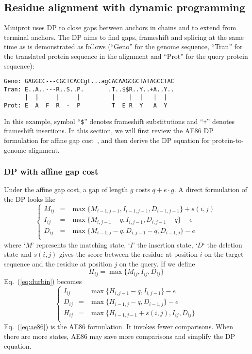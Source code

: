 \documentclass{bioinfo}
\begin{document}
\begin{methods}
\subsection{Residue alignment with dynamic programming}

Miniprot uses DP to close gaps between anchors in chains and to extend from
terminal anchors. The DP aims to find gaps, frameshift and splicing at the
same time as is demonstrated as follows (``Geno'' for the genome sequence,
``Tran'' for the translated protein sequence in the alignment and ``Prot'' for
the query protein sequence):
\begin{verbatim}
Geno: GAGGCC---CGCTCACCgt...agCACAAGCGCTATAGCCTAC
Tran: E..A..---R..S..P.       .T..$$R..Y..+A..Y..
      |  |     |     |         |    |  |   |  |
Prot: E  A  F  R  -  P         T  E R  Y   A  Y
\end{verbatim}
In this example, symbol ``{\tt \$}'' denotes frameshift substitutions and
``{\tt +}'' denotes frameshift insertions. In this section, we will first
review the AE86 DP formulation for affine gap cost~\citep{Altschul:1986aa}, and
then derive the DP equation for protein-to-genome alignment.

\subsubsection{DP with affine gap cost}

Under the affine gap cost, a gap of length $g$ costs $q+e\cdot g$. A direct
formulation of the DP looks like
\begin{equation}\label{eq:durbin}
\left\{\begin{array}{lll}
M_{ij}&=&\max\{ M_{i-1,j-1}, I_{i-1,j-1}, D_{i-1,j-1} \} + s(i,j) \\
I_{ij}&=&\max\{ M_{i,j-1} - q, I_{i,j-1}, D_{i,j-1} - q \} - e\\
D_{ij}&=&\max\{ M_{i-1,j} - q, D_{i,j-1} - q, D_{i-1,j} \} - e\\
\end{array}\right.
\end{equation}
where `$M$' represents the matching state, `$I$' the insertion state, `$D$` the
deletion state and $s(i,j)$ gives the score between the residue at position $i$
on the target sequence and the residue at position $j$ on the query. If we
define
$$
H_{ij} = \max\{M_{ij},I_{ij},D_{ij}\}
$$
Eq.~(\ref{eq:durbin}) becomes
\begin{equation}\label{eq:ae86}
\left\{\begin{array}{lll}
I_{ij}&=&\max\{ H_{i,j-1} - q, I_{i,j-1} \} - e\\
D_{ij}&=&\max\{ H_{i-1,j} - q, D_{i-1,j} \} - e\\
H_{ij}&=&\max\{ H_{i-1,j-1} + s(i,j), I_{ij}, D_{ij} \} \\
\end{array}\right.
\end{equation}
Eq.~(\ref{eq:ae86}) is the AE86 formulation. It invokes fewer comparisons. When
there are more states, AE86 may save more comparisons and simplify the DP
equation.


\end{methods}
\end{document}
